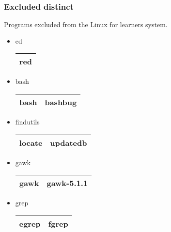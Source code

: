 \newpage

\subsubsection{Excluded distinct}

Programs excluded from the Linux for learners system.

\begin{itemize}
    \item ed 
        \begin{center}
            \begin{tabular}{|c|}
                \hline
                red \\
                \hline
            \end{tabular}
        \end{center}
    \item bash
        \begin{center}
            \begin{tabular}{|c|c|}
                \hline
                bash & bashbug \\
                \hline
            \end{tabular}
        \end{center}
    \item findutils
        \begin{center}
            \begin{tabular}{|c|c|}
                \hline
                locate & updatedb \\
                \hline
            \end{tabular}
        \end{center}
    \item gawk
        \begin{center}
            \begin{tabular}{|c|c|}
                \hline
                gawk & gawk-5.1.1 \\
                \hline
            \end{tabular}
        \end{center}
    \item grep
        \begin{center}
            \begin{tabular}{|c|c|}
                \hline
                egrep & fgrep \\
                \hline
            \end{tabular}
        \end{center}

\end{itemize}
